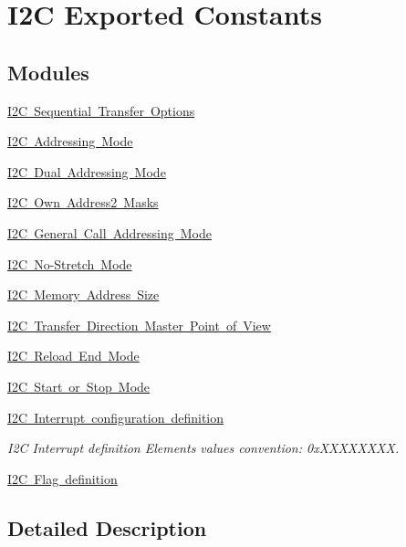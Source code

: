 \hypertarget{group___i2_c___exported___constants}{}\section{I2C Exported Constants}
\label{group___i2_c___exported___constants}
\subsection*{Modules}
\begin{DoxyCompactItemize}
\item 
\mbox{\hyperlink{group___i2_c___x_f_e_r_o_p_t_i_o_n_s}{I2\+C Sequential Transfer Options}}
\item 
\mbox{\hyperlink{group___i2_c___a_d_d_r_e_s_s_i_n_g___m_o_d_e}{I2\+C Addressing Mode}}
\item 
\mbox{\hyperlink{group___i2_c___d_u_a_l___a_d_d_r_e_s_s_i_n_g___m_o_d_e}{I2\+C Dual Addressing Mode}}
\item 
\mbox{\hyperlink{group___i2_c___o_w_n___a_d_d_r_e_s_s2___m_a_s_k_s}{I2\+C Own Address2 Masks}}
\item 
\mbox{\hyperlink{group___i2_c___g_e_n_e_r_a_l___c_a_l_l___a_d_d_r_e_s_s_i_n_g___m_o_d_e}{I2\+C General Call Addressing Mode}}
\item 
\mbox{\hyperlink{group___i2_c___n_o_s_t_r_e_t_c_h___m_o_d_e}{I2\+C No-\/\+Stretch Mode}}
\item 
\mbox{\hyperlink{group___i2_c___m_e_m_o_r_y___a_d_d_r_e_s_s___s_i_z_e}{I2\+C Memory Address Size}}
\item 
\mbox{\hyperlink{group___i2_c___x_f_e_r_d_i_r_e_c_t_i_o_n}{I2\+C Transfer Direction Master Point of View}}
\item 
\mbox{\hyperlink{group___i2_c___r_e_l_o_a_d___e_n_d___m_o_d_e}{I2\+C Reload End Mode}}
\item 
\mbox{\hyperlink{group___i2_c___s_t_a_r_t___s_t_o_p___m_o_d_e}{I2\+C Start or Stop Mode}}
\item 
\mbox{\hyperlink{group___i2_c___interrupt__configuration__definition}{I2\+C Interrupt configuration definition}}
\begin{DoxyCompactList}\small\item\em I2C Interrupt definition Elements values convention\+: 0x\+X\+X\+X\+X\+X\+X\+XX. \end{DoxyCompactList}\item 
\mbox{\hyperlink{group___i2_c___flag__definition}{I2\+C Flag definition}}
\end{DoxyCompactItemize}


\subsection{Detailed Description}
